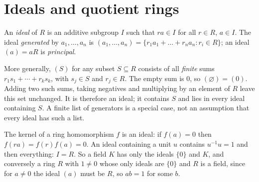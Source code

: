 \section{Ideals and quotient rings}

\begin{definition}
An \emph{ideal} of $R$ is an additive subgroup $I$ such that $ra\in I$ for all $r\in R$, $a\in I$. The ideal \emph{generated} by $a_1,\dots,a_n$ is $(a_1,\dots,a_n)=\{r_1a_1+\dots+r_na_n:r_i\in R\}$; an ideal $(a)=aR$ is \emph{principal}.
\end{definition}

More generally, $(S)$ for any subset $S\subseteq R$ consists of all
\emph{finite} sums $r_1s_1+\cdots+r_ks_k$, with $s_j\in S$ and
$r_j\in R$. The empty sum is $0$, so $(\varnothing)=(0)$.
Adding two such sums, taking negatives and multiplying by an element of
$R$ leave this set unchanged. It is therefore an ideal; it contains $S$
and lies in every ideal containing $S$. A finite list of generators is
a special case, not an assumption that every ideal has such a list.

The kernel of a ring homomorphism $f$ is an ideal: if $f(a)=0$ then $f(ra)=f(r)f(a)=0$. An ideal containing a unit $u$ contains $u^{-1}u=1$ and then everything: $I=R$. So a field $K$ has only the ideals $\{0\}$ and $K$, and conversely a ring $R$ with $1\ne0$ whose only ideals are $\{0\}$ and $R$ is a field, since for $a\ne0$ the ideal $(a)$ must be $R$, so $ab=1$ for some $b$.

